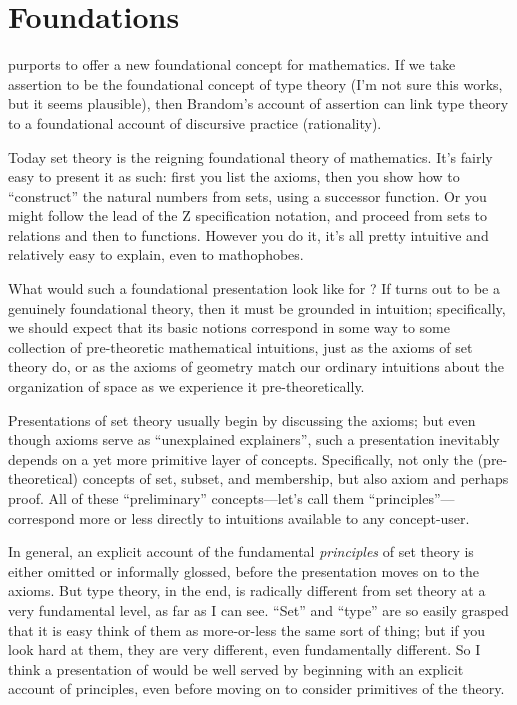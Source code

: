 \section{Foundations}
\label{sect:foundations}

\HoTT purports to offer a new foundational concept for mathematics.  If
we take assertion to be the foundational concept of type theory (I'm
not sure this works, but it seems plausible), then Brandom's account
of assertion can link type theory to a foundational account of
discursive practice (rationality).

Today set theory is the reigning foundational theory of mathematics.
It's fairly easy to present it as such: first you list the axioms,
then you show how to ``construct'' the natural numbers from sets,
using a successor function.  Or you might follow the lead of the Z
specification notation, and proceed from
sets to relations and then to functions.  However you do it, it's all
pretty intuitive and relatively easy to explain, even to mathophobes.

What would such a foundational presentation look like for \HoTT?  If
\HoTT turns out to be a genuinely foundational theory, then it must be
grounded in intuition; specifically, we should expect that its basic
notions correspond in some way to some collection of pre-theoretic
mathematical intuitions, just as the axioms of set theory do, or as
the axioms of geometry match our ordinary intuitions about the
organization of space as we experience it pre-theoretically.

Presentations of set theory usually begin by discussing the axioms;
but even though axioms serve as ``unexplained explainers'', such a
presentation inevitably depends on a yet more primitive layer of
concepts.  Specifically, not only the (pre-theoretical) concepts of
set, subset, and membership, but also axiom and perhaps proof.  All of
these ``preliminary'' concepts---let's call them
``principles''---correspond more or less directly to intuitions
available to any concept-user.

In general, an explicit account of the fundamental \textit{principles}
of set theory is either omitted or informally glossed, before the
presentation moves on to the axioms.  But type theory, in the end, is
radically different from set theory at a very fundamental level, as
far as I can see.  ``Set'' and ``type'' are so easily grasped that it
is easy think of them as more-or-less the same sort of thing; but if
you look hard at them, they are very different, even fundamentally
different.  So I think a presentation of \HoTT would be well served by
beginning with an explicit account of principles, even before moving
on to consider primitives of the theory.

